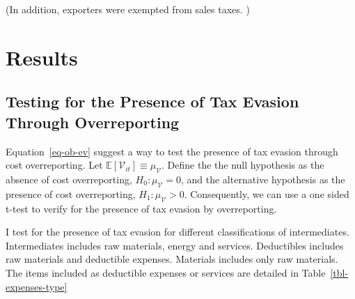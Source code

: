 \documentclass[
  12pt]{article}
\theoremstyle{definition}
\theoremstyle{remark}
\begin{document}
(In addition, exporters were exempted from sales taxes. )

\section{Results}\label{results-1}

\subsection{Testing for the Presence of Tax Evasion Through
Overreporting}\label{testing-for-the-presence-of-tax-evasion-through-overreporting}

Equation~\ref{eq-ob-ev} suggest a way to test the presence of tax
evasion through cost overreporting. Let
\(\mathbb{E}[\mathcal{V}_{it}]\equiv \mu_{\mathcal{V}}\). Define the the
null hypothesis as the absence of cost overreporting,
\(H_0: \mu_{\mathcal{V}}=0\), and the alternative hypothesis as the
presence of cost overreporting, \(H_1: \mu_{\mathcal{V}}>0\).
Consequently, we can use a one sided t-test to verify for the presence
of tax evasion by overreporting.

I test for the presence of tax evasion for different classifications of
intermediates. Intermediates includes raw materials, energy and
services. Deductibles includes raw materials and deductible expenses.
Materials includes only raw materials. The items included as deductible
expenses or services are detailed in Table~\ref{tbl-expenses-type}
\end{document}
